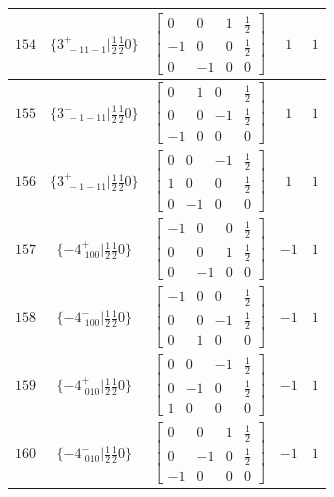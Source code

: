 \documentclass[fleqn,8pt]{jsarticle}
\begin{document}
\begin{longtable}{ccccc}
$ 154 $ & $ \{3^{+}_{\,\,-11-1}|\frac{1}{2} \frac{1}{2} 0\} $ & $ \begin{bmatrix} 0 & 0 & 1 & \frac{1}{2} \\ -1 & 0 & 0 & \frac{1}{2} \\ 0 & -1 & 0 & 0 \end{bmatrix} $ & $ 1 $ & $ 1 $ \\ \hline
$ 155 $ & $ \{3^{-}_{\,\,-1-11}|\frac{1}{2} \frac{1}{2} 0\} $ & $ \begin{bmatrix} 0 & 1 & 0 & \frac{1}{2} \\ 0 & 0 & -1 & \frac{1}{2} \\ -1 & 0 & 0 & 0 \end{bmatrix} $ & $ 1 $ & $ 1 $ \\ \hline
$ 156 $ & $ \{3^{+}_{\,\,-1-11}|\frac{1}{2} \frac{1}{2} 0\} $ & $ \begin{bmatrix} 0 & 0 & -1 & \frac{1}{2} \\ 1 & 0 & 0 & \frac{1}{2} \\ 0 & -1 & 0 & 0 \end{bmatrix} $ & $ 1 $ & $ 1 $ \\ \hline
$ 157 $ & $ \{-4^{+}_{\,\,100}|\frac{1}{2} \frac{1}{2} 0\} $ & $ \begin{bmatrix} -1 & 0 & 0 & \frac{1}{2} \\ 0 & 0 & 1 & \frac{1}{2} \\ 0 & -1 & 0 & 0 \end{bmatrix} $ & $ -1 $ & $ 1 $ \\ \hline
$ 158 $ & $ \{-4^{-}_{\,\,100}|\frac{1}{2} \frac{1}{2} 0\} $ & $ \begin{bmatrix} -1 & 0 & 0 & \frac{1}{2} \\ 0 & 0 & -1 & \frac{1}{2} \\ 0 & 1 & 0 & 0 \end{bmatrix} $ & $ -1 $ & $ 1 $ \\ \hline
$ 159 $ & $ \{-4^{+}_{\,\,010}|\frac{1}{2} \frac{1}{2} 0\} $ & $ \begin{bmatrix} 0 & 0 & -1 & \frac{1}{2} \\ 0 & -1 & 0 & \frac{1}{2} \\ 1 & 0 & 0 & 0 \end{bmatrix} $ & $ -1 $ & $ 1 $ \\ \hline
$ 160 $ & $ \{-4^{-}_{\,\,010}|\frac{1}{2} \frac{1}{2} 0\} $ & $ \begin{bmatrix} 0 & 0 & 1 & \frac{1}{2} \\ 0 & -1 & 0 & \frac{1}{2} \\ -1 & 0 & 0 & 0 \end{bmatrix} $ & $ -1 $ & $ 1 $ \\ \hline

\end{longtable}
\end{document}
